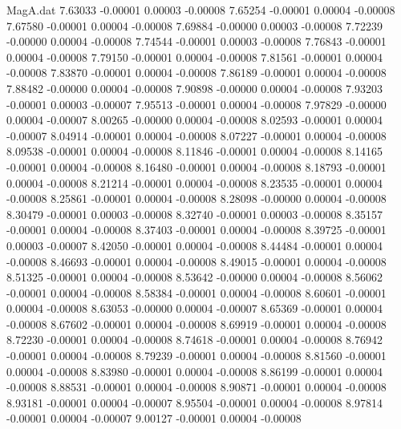 \begin{filecontents}{MagA.dat}
   7.63033   -0.00001    0.00003   -0.00008
   7.65254   -0.00001    0.00004   -0.00008
   7.67580   -0.00001    0.00004   -0.00008
   7.69884   -0.00000    0.00003   -0.00008
   7.72239   -0.00000    0.00004   -0.00008
   7.74544   -0.00001    0.00003   -0.00008
   7.76843   -0.00001    0.00004   -0.00008
   7.79150   -0.00001    0.00004   -0.00008
   7.81561   -0.00001    0.00004   -0.00008
   7.83870   -0.00001    0.00004   -0.00008
   7.86189   -0.00001    0.00004   -0.00008
   7.88482   -0.00000    0.00004   -0.00008
   7.90898   -0.00000    0.00004   -0.00008
   7.93203   -0.00001    0.00003   -0.00007
   7.95513   -0.00001    0.00004   -0.00008
   7.97829   -0.00000    0.00004   -0.00007
   8.00265   -0.00000    0.00004   -0.00008
   8.02593   -0.00001    0.00004   -0.00007
   8.04914   -0.00001    0.00004   -0.00008
   8.07227   -0.00001    0.00004   -0.00008
   8.09538   -0.00001    0.00004   -0.00008
   8.11846   -0.00001    0.00004   -0.00008
   8.14165   -0.00001    0.00004   -0.00008
   8.16480   -0.00001    0.00004   -0.00008
   8.18793   -0.00001    0.00004   -0.00008
   8.21214   -0.00001    0.00004   -0.00008
   8.23535   -0.00001    0.00004   -0.00008
   8.25861   -0.00001    0.00004   -0.00008
   8.28098   -0.00000    0.00004   -0.00008
   8.30479   -0.00001    0.00003   -0.00008
   8.32740   -0.00001    0.00003   -0.00008
   8.35157   -0.00001    0.00004   -0.00008
   8.37403   -0.00001    0.00004   -0.00008
   8.39725   -0.00001    0.00003   -0.00007
   8.42050   -0.00001    0.00004   -0.00008
   8.44484   -0.00001    0.00004   -0.00008
   8.46693   -0.00001    0.00004   -0.00008
   8.49015   -0.00001    0.00004   -0.00008
   8.51325   -0.00001    0.00004   -0.00008
   8.53642   -0.00000    0.00004   -0.00008
   8.56062   -0.00001    0.00004   -0.00008
   8.58384   -0.00001    0.00004   -0.00008
   8.60601   -0.00001    0.00004   -0.00008
   8.63053   -0.00000    0.00004   -0.00007
   8.65369   -0.00001    0.00004   -0.00008
   8.67602   -0.00001    0.00004   -0.00008
   8.69919   -0.00001    0.00004   -0.00008
   8.72230   -0.00001    0.00004   -0.00008
   8.74618   -0.00001    0.00004   -0.00008
   8.76942   -0.00001    0.00004   -0.00008
   8.79239   -0.00001    0.00004   -0.00008
   8.81560   -0.00001    0.00004   -0.00008
   8.83980   -0.00001    0.00004   -0.00008
   8.86199   -0.00001    0.00004   -0.00008
   8.88531   -0.00001    0.00004   -0.00008
   8.90871   -0.00001    0.00004   -0.00008
   8.93181   -0.00001    0.00004   -0.00007
   8.95504   -0.00001    0.00004   -0.00008
   8.97814   -0.00001    0.00004   -0.00007
   9.00127   -0.00001    0.00004   -0.00008

\end{filecontents}
